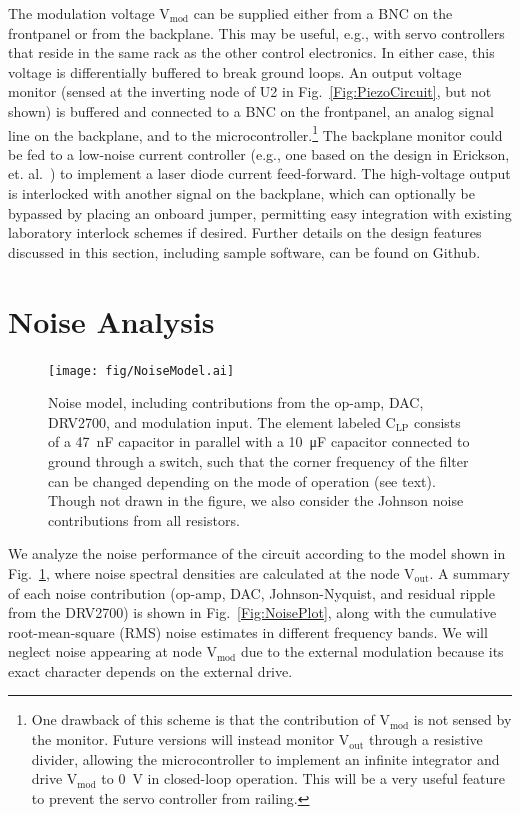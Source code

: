 \documentclass[aip,rsi,reprint]{revtex4-1} %
\begin{document}
The modulation voltage $\text{V}_\text{mod}$ can be supplied either from a BNC on the frontpanel or from the backplane.
This may be useful, e.g., with servo controllers that reside in the same rack as the other control electronics.
In either case, this voltage is differentially buffered to break ground loops.
An output voltage monitor (sensed at the inverting node of U2 in Fig.~\ref{Fig:PiezoCircuit}, but not shown) is buffered and connected to a BNC on the frontpanel, an analog signal line on the backplane, and to the microcontroller.\footnote{One drawback of this scheme is that the contribution of $\text{V}_\text{mod}$ is not sensed by the monitor. Future versions will instead monitor $\text{V}_\text{out}$ through a resistive divider, allowing the microcontroller to implement an infinite integrator and drive $\text{V}_\text{mod}$ to \SI{0}{\volt} in closed-loop operation. This will be a very useful feature to prevent the servo controller from railing.}
The backplane monitor could be fed to a low-noise current controller (e.g., one based on the design in Erickson, et. al.~\cite{Erickson2008a}) to implement a laser diode current feed-forward.
The high-voltage output is interlocked with another signal on the backplane, which can optionally be bypassed by placing an onboard jumper, permitting easy integration with existing laboratory interlock schemes if desired.
Further details on the design features discussed in this section, including sample software, can be found on Github.\cite{PiezoDesignFiles}

\section{Noise Analysis}
\label{Sec:NoiseAnalysis}

\begin{figure}[t]
\texttt{[image: fig/NoiseModel.ai]}
\caption{Noise model, including contributions from the op-amp, DAC, DRV2700, and modulation input. The element labeled $\text{C}_\text{LP}$ consists of a \SI{47}{\nano\farad} capacitor in parallel with a \SI{10}{\micro\farad} capacitor connected to ground through a switch, such that the corner frequency of the filter can be changed depending on the mode of operation  (see text). Though not drawn in the figure, we also consider the Johnson noise contributions from all resistors.
\label{Fig:NoiseModel}}
\end{figure}

We analyze the noise performance of the circuit according to the model shown in Fig.~\ref{Fig:NoiseModel}, where noise spectral densities are calculated at the node $\text{V}_\text{out}$.
A summary of each noise contribution (op-amp, DAC, Johnson-Nyquist, and residual ripple from the DRV2700) is shown in Fig.~\ref{Fig:NoisePlot}, along with the cumulative root-mean-square (RMS) noise estimates in different frequency bands.
We will neglect noise appearing at node $\text{V}_\text{mod}$ due to the external modulation because its exact character depends on the external drive.
\end{document}
